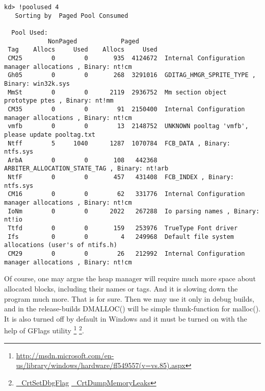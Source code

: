 \begin{lstlisting}
kd> !poolused 4
   Sorting by  Paged Pool Consumed

  Pool Used:
            NonPaged            Paged
 Tag    Allocs     Used    Allocs     Used
 CM25        0        0       935  4124672	Internal Configuration manager allocations , Binary: nt!cm
 Gh05        0        0       268  3291016	GDITAG_HMGR_SPRITE_TYPE , Binary: win32k.sys
 MmSt        0        0      2119  2936752	Mm section object prototype ptes , Binary: nt!mm
 CM35        0        0        91  2150400	Internal Configuration manager allocations , Binary: nt!cm
 vmfb        0        0        13  2148752	UNKNOWN pooltag 'vmfb', please update pooltag.txt
 Ntff        5     1040      1287  1070784	FCB_DATA , Binary: ntfs.sys
 ArbA        0        0       108   442368	ARBITER_ALLOCATION_STATE_TAG , Binary: nt!arb
 NtfF        0        0       457   431408	FCB_INDEX , Binary: ntfs.sys
 CM16        0        0        62   331776	Internal Configuration manager allocations , Binary: nt!cm
 IoNm        0        0      2022   267288	Io parsing names , Binary: nt!io
 Ttfd        0        0       159   253976	TrueType Font driver 
 Ifs         0        0         4   249968	Default file system allocations (user's of ntifs.h) 
 CM29        0        0        26   212992	Internal Configuration manager allocations , Binary: nt!cm
\end{lstlisting}

{Of course, one may argue the heap manager will require much more space about allocated blocks,
including their names or tags}.
{And it is slowing down the program much more. That is for sure.}
{Then we may use it only in debug builds, and in the release-builds DMALLOC() will be
simple  thunk-function for} malloc().
{It is also turned off by default in Windows and it must be turned on with the help of GFlags utility}
\footnote{\url{http://msdn.microsoft.com/en-us/library/windows/hardware/ff549557(v=vs.85).aspx}}
\footnote{ 
\href{http://msdn.microsoft.com/en-us/library/5at7yxcs.aspx}{\_CrtSetDbgFlag}
\href{http://msdn.microsoft.com/en-us/library/d41t22sb.aspx}{\_CrtDumpMemoryLeaks}}.

